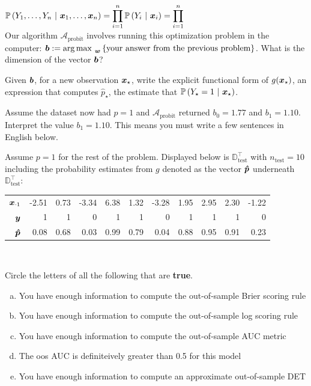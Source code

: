 \documentclass[12pt]{article}
\begin{document}
$\mathbb{P}\left(Y_1, \ldots, Y_n~|~\boldsymbol{x}_1, \ldots, \boldsymbol{x}_n\right) = \displaystyle\prod_{i=1}^n \mathbb{P}\left(Y_i~|~\boldsymbol{x}_i\right) =\prod_{i=1}^n  $\\

 Our algorithm $\mathcal{A}_{\text{probit}}$ involves running this optimization problem in the computer: $\boldsymbol{b} := \operatorname*{arg\,max~}_{\boldsymbol{w}} \left\{\text{your answer from the previous problem}\right\}$. What is the dimension of the vector $\boldsymbol{b}$?

 Given $\boldsymbol{b}$, for a new observation $\boldsymbol{x}_\star$, write the explicit functional form of $g(\boldsymbol{x}_\star)$, an expression that computes $\hat{p}_\star$, the estimate that $\mathbb{P}\left(Y_\star = 1~|~\boldsymbol{x}_\star\right)$. 


 Assume the dataset now had $p=1$ and $\mathcal{A}_{\text{probit}}$ returned $b_0 = 1.77$ and $b_1 = 1.10$. Interpret the value $b_1 = 1.10$. This means you must write a few sentences in English below.


Assume $p=1$ for the rest of the problem. Displayed below is $\mathbb{D}_{\text{test}}^\top$ with $n_{\text{test}} = 10$ including the probability estimates from $g$ denoted as the vector $\boldsymbol{\hat{p}}$ underneath $\mathbb{D}_{\text{test}}^\top$:

\begin{table}[ht]
\centering
\begin{tabular}{r|rrrrrrrrrr}
$\boldsymbol{x}_{\cdot 1}$ & -2.51 & 0.73 & -3.34 & 6.38 & 1.32 & -3.28 & 1.95 & 2.95 & 2.30 & -1.22 \\ 
$\boldsymbol{y}$ & 1 & 1 & 0 & 1 & 1 & 0 & 1 & 1 & 1 & 0 \\ \hline
$\boldsymbol{\hat{p}}$ & 0.08 & 0.68 & 0.03 & 0.99 & 0.79 & 0.04 & 0.88 & 0.95 & 0.91 & 0.23
\end{tabular}
\end{table}~\vspace{1.5cm}


 Circle the letters of all the following that are \textbf{true}.


\begin{enumerate}[(a)]
\item You have enough information to compute the out-of-sample Brier scoring rule
\item You have enough information to compute the out-of-sample log scoring rule
\item You have enough information to compute the out-of-sample AUC metric
\item The oos AUC is definiteively greater than 0.5 for this model
\item You have enough information to compute an approximate out-of-sample DET
\end{enumerate}
\end{document}
